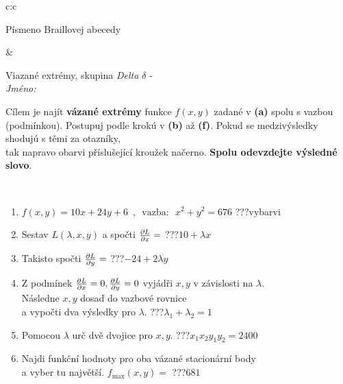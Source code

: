 \documentclass[10pt]{report}
\begin{document}
\begin{tabular}{c:c}
\begin{minipage}[c][104.5mm][t]{0.5\linewidth}
\begin{center}
\begin{minipage}{0.20\linewidth}
\begin{center}
{\small Písmeno Braillovej abecedy}
\end{center}
\end{minipage}
\end{center}
\end{minipage}
&
\begin{minipage}[c][104.5mm][t]{0.5\linewidth}
\begin{center}
\vspace{7mm}
{\huge Viazané extrémy, skupina \textit{Delta $\delta$} -}\\[5mm]
\textit{Jméno:}\phantom{xxxxxxxxxxxxxxxxxxxxxxxxxxxxxxxxxxxxxxxxxxxxxxxxxxxxxxxxxxxxxxxxx}\\[5mm]
\begin{minipage}{0.95\linewidth}
\begin{center}
Cílem je najít \textbf{vázané extrémy} funkce $f(x,y)$ zadané v \textbf{(a)} spolu s vazbou (podmínkou). Postupuj podle krokú v \textbf{(b)} až \textbf{(f)}. Pokud se medzivýsledky shodujú s těmi za otazníky,\\tak napravo obarvi příslušející kroužek načerno. \textbf{Spolu odevzdejte výsledné slovo}.
\end{center}
\end{minipage}
\\[1mm]
\begin{minipage}{0.79\linewidth}
\begin{center}
\begin{varwidth}{\linewidth}
\begin{enumerate}
\normalsize
\item $f(x,y)=10x+24y+6 \enspace , \enspace \mathrm{vazba:} \enspace x^2+y^2=676$\quad \dotfill\; ???\;\dotfill \quad vybarvi
\item Sestav $L(\lambda,x,y)$ a spočti $\pdv{L}{x}=$\quad \dotfill\; ???\;\dotfill \quad $10+\lambda x$
\item Takisto spočti $\pdv{L}{y}=$\quad \dotfill\; ???\;\dotfill \quad $-24+2\lambda y$
\item Z podmínek $\pdv{L}{x}=0 , \pdv{L}{y}=0$ vyjádři $x,y$ v závislosti na $\lambda$.\\ \phantom{xxxxxx}Následne $x,y$ dosaď do vazbové rovnice\\ \phantom{xxxxxx}a vypočti dva výsledky pro $\lambda$.\quad \dotfill\; ???\;\dotfill \quad $\lambda_1+\lambda_2=1$
\item Pomocou $\lambda$ urč dvě dvojice pro $x,y$.\quad \dotfill\; ???\;\dotfill \quad $x_1 x_2 y_1 y_2=2400$
\item Najdi funkční hodnoty pro oba vázané stacionární body\\ \phantom{xxxxxx}a vyber tu najvětší. $f_{\text{max}}(x,y)=$\quad \dotfill\; ???\;\dotfill \quad $681$

\end{enumerate}
\end{varwidth}
\end{center}
\end{minipage}
\end{center}
\end{minipage}
\end{tabular}
\end{document}
